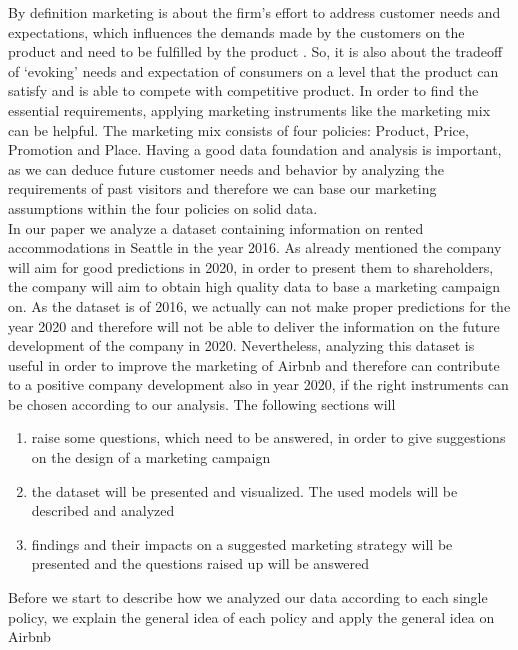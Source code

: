 \documentclass[journal]{IEEEtran}
\begin{document}
By definition marketing is about the firm’s effort to address customer needs and expectations, which influences the demands made by the customers on the product and need to be fulfilled by the product \cite{schiernbeck}. So, it is also about the tradeoff of ‘evoking’ needs and expectation of consumers on a level that the product can satisfy and is able to compete with competitive product. In order to find the essential requirements, applying marketing instruments like the marketing mix can be helpful. The marketing mix consists of four policies: Product, Price, Promotion and Place. Having a good data foundation and analysis is important, as we can deduce future customer needs and behavior by analyzing the requirements of past visitors and therefore we can base our marketing assumptions within the four policies on solid data.\\
In our paper we analyze a dataset containing information on rented accommodations in Seattle in the year 2016. As already mentioned the company will aim for good predictions in 2020, in order to present them to shareholders, the company will aim to obtain high quality data to base a marketing campaign on. As the dataset is of 2016, we actually can not make proper predictions for the year 2020 and therefore will not be able to deliver the information on the future development of the company in 2020. Nevertheless, analyzing this dataset is useful in order to improve the marketing of Airbnb and therefore can contribute to a positive company development also in year 2020, if the right instruments can be chosen according to our analysis. The following sections will 
\begin{enumerate}
\item raise some questions, which need to be answered, in order to give suggestions on the design of a marketing campaign
\item the dataset will be presented and visualized. The used models will be described and analyzed
\item findings and their impacts on a suggested marketing strategy will be presented and the questions raised up will be answered\\
\end{enumerate} 

\noindent Before we start to describe how we analyzed our data according to each single policy, we explain the general idea of each policy and apply the general idea on Airbnb
\end{document}
